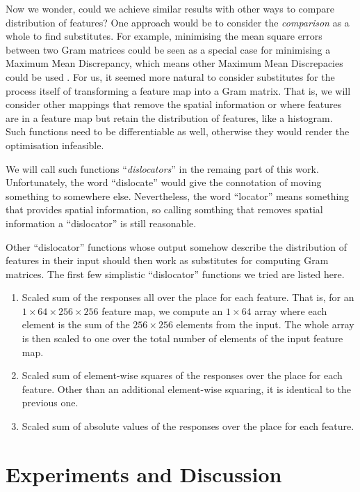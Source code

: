 \documentclass[runningheads]{llncs}
\begin{document}
Now we wonder, could we achieve similar results with other ways to compare 
distribution of features?
One approach would be to consider the \emph{comparison} as a whole to find 
substitutes. 
For example, minimising the mean square errors between two Gram matrices could be seen as 
a special case for minimising a Maximum Mean Discrepancy, which means other Maximum Mean Discrepacies
could be used \cite{MMD}.
For us, it seemed more natural to consider substitutes for the process itself of 
transforming a feature map into a Gram matrix. 
That is, we will consider other
mappings that remove the spatial information or where features are in a feature map but retain
the distribution of features, like a histogram.
Such functions need to be differentiable as well, otherwise they would render the 
optimisation infeasible.

We will call such functions ``\emph{dislocators}'' in the remaing part of this work.
Unfortunately, the word ``dislocate'' would give the connotation of moving something to somewhere else.
Nevertheless, the word ``locator'' means something that provides spatial information,
so calling somthing that removes spatial information a ``dislocator'' is still reasonable.

Other ``dislocator'' functions whose output somehow describe the 
distribution of features in their input should then work as substitutes
for computing Gram matrices.
The first few simplistic ``dislocator'' functions we tried are listed here.
\begin{enumerate}
\item Scaled sum of the responses all over the place for each feature.
That is, for an $1\times64\times256\times256$ feature map,
we compute an $1\times64$ array where each element is the sum of the
$256\times256$ elements from the input.
The whole array is then scaled to one over the total number of elements of the input feature map.
\item Scaled sum of element-wise squares of the responses over the place for each feature.
Other than an additional element-wise squaring, it is identical to the previous one.
\item Scaled sum of absolute values of the responses over the place for each feature.
\end{enumerate}



\section{Experiments and Discussion}
\end{document}
